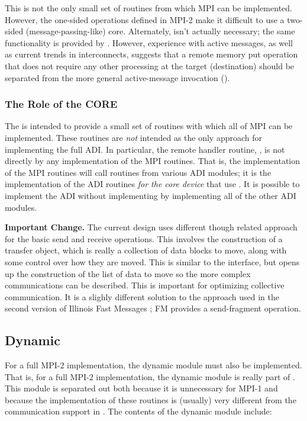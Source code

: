 \documentclass{article}
\begin{document}
This is not the only small set of routines from which MPI can be
implemented.  However, the one-sided operations defined in MPI-2 make
it difficult to use a two-sided (message-passing-like) core.
Alternately,  isn't actually necessary; the same
functionality is provided by .  However, experience
with active messages, as well as current trends in interconnects,
suggests that a remote memory put operation that does not require any
other processing at the target (destination) should be separated from
the more general active-message invocation ().

\subsubsection{The Role of the CORE}
The  is intended to provide a small set of routines
with which all of MPI can be implemented.  These routines are
\emph{not} intended as the only approach for implementing the full
ADI.  In particular, the remote handler routine, , is
not directly by any implementation of the MPI routines.  That is, the
implementation of the MPI routines will call routines from various ADI
modules; it is the implementation of the ADI routines \emph{for the
core device} that use .  It is possible to implement
the ADI without implementing  by implementing all of
the other ADI modules.

\textbf{Important Change.}  The current design uses different though
related approach for the basic send and receive operations.  This
involves the construction of a transfer object, which is really a
collection of data blocks to move, along with some control over how
they are moved.  This is similar to the  interface,
but opens up the construction of the list of data to move so the more
complex communications can be described.  This is important for
optimizing collective communication.  It is a slighly different
solution to the approach used in the second version of Illinois Fast
Messages \cite{pakinxx}; FM provides a send-fragment operation.

\subsection{Dynamic}
For a full MPI-2 implementation, the dynamic module must also be
implemented.  That is, for a full MPI-2 implementation, the dynamic
module is really part of .  This module is separated
out both because it is unnecessary for MPI-1 and because the
implementation of these routines is (usually) very different from the
communication support in .  The contents of the
dynamic module include:
\end{document}
